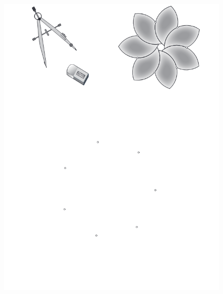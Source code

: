\begin{figure}[H]
  \centering
  \includegraphics[width=0.9\linewidth]{6x4-symetrie/ex5.png}
\end{figure}

